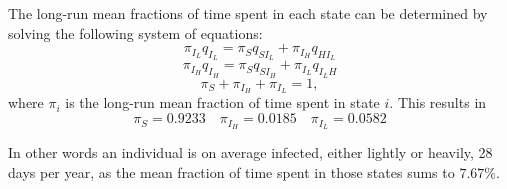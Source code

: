 The long-run mean fractions of time spent in each state can be determined by solving the following system of equations:
$$ \pi_{I_L} q_{I_L} = \pi_S q_{S{I_L}} + \pi_{I_H} q_{H{I_L}}$$
$$ \pi_{I_H} q_{I_H} = \pi_S q_{S{I_H}} + \pi_{I_L} q_{{I_L}H}$$
$$ \pi_S + \pi_{I_H} +\pi_{I_L} = 1, $$
where $\pi_i$ is the long-run mean fraction of time spent in state $i$. This results in 
$$\pi_S = 0.9233 \quad \pi_{I_H} = 0.0185 \quad \pi_{I_L} = 0.0582$$

In other words an individual is on average infected, either lightly or heavily, 28 days per year, as the mean fraction of time spent in those states sums to $7.67\%$.


